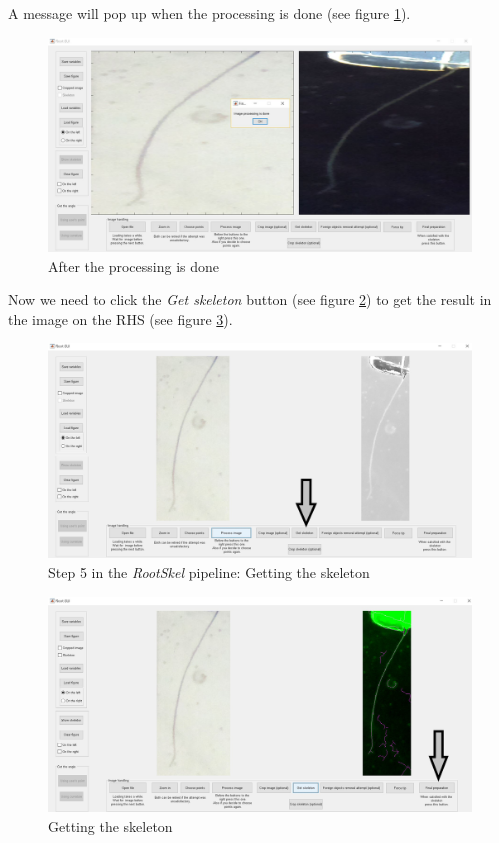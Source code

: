 A message will pop up when the processing is done (see figure \ref{fig:img17}).
\begin{figure}[H]
	\centering
	\includegraphics[width=\textwidth]{../Figures/manual/step14.jpg}
	\caption{After the processing is done}
	\label{fig:img17}
\end{figure}

Now we need to click the \textit{Get skeleton} button (see figure \ref{fig:img18}) to get the result in the image on the RHS (see figure \ref{fig:img19}).

\begin{figure}[H]
	\centering
	\includegraphics[width=\textwidth]{../Figures/manual/step15.jpg}
	\caption{Step 5 in the \textit{RootSkel} pipeline: Getting the skeleton}
	\label{fig:img18}
\end{figure}

\begin{figure}[H]
	\centering
	\includegraphics[width=\textwidth]{../Figures/manual/step16.jpg}
	\caption{Getting the skeleton}
	\label{fig:img19}
\end{figure}

